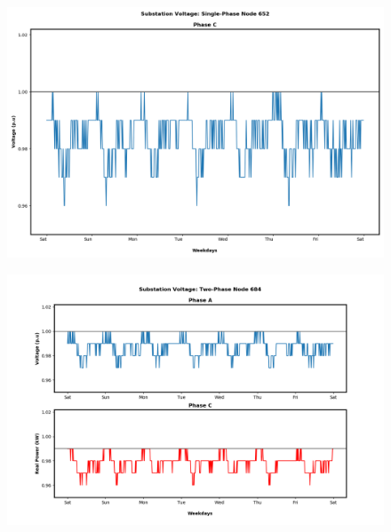 \begin{figure}[H]
    \centering
    \includegraphics[width=1.1\columnwidth]{Pictures/hundred_single_phase_652_volt.png}
    \caption{}
\end{figure}

\newpage

\begin{figure}[H]
    \centering
    \includegraphics[width=1.1\columnwidth]{Pictures/hundred_two_phase_684_volt.png}
    \caption{}
\end{figure}

\newpage

